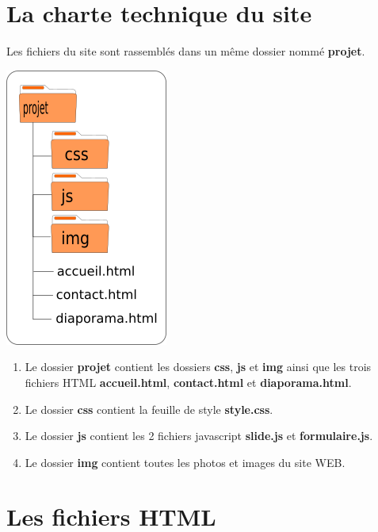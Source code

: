 \documentclass[11pt]{article}
\providecommand{\tightlist}{%
      \setlength{\itemsep}{0pt}\setlength{\parskip}{0pt}}
\begin{document}
\hypertarget{la-charte-technique-du-site}{%
\section{La charte technique du
site}\label{la-charte-technique-du-site}}

Les fichiers du site sont rassemblés dans un même dossier nommé
\textbf{projet}.

\begin{center}
\includegraphics[scale=1]{img/arbo_projet.png}
\end{center}

\begin{enumerate}
\def\labelenumi{\arabic{enumi}.}
\tightlist
\item
  Le dossier \textbf{projet} contient les dossiers \textbf{css},
  \textbf{js} et \textbf{img} ainsi que les trois fichiers HTML
  \textbf{accueil.html}, \textbf{contact.html} et
  \textbf{diaporama.html}.
\item
  Le dossier \textbf{css} contient la feuille de style
  \textbf{style.css}.
\item
  Le dossier \textbf{js} contient les 2 fichiers javascript
  \textbf{slide.js} et \textbf{formulaire.js}.
\item
  Le dossier \textbf{img} contient toutes les photos et images du site
  WEB.
\end{enumerate}

    \hypertarget{les-fichiers-html}{%
\section{Les fichiers HTML}\label{les-fichiers-html}}
\end{document}
